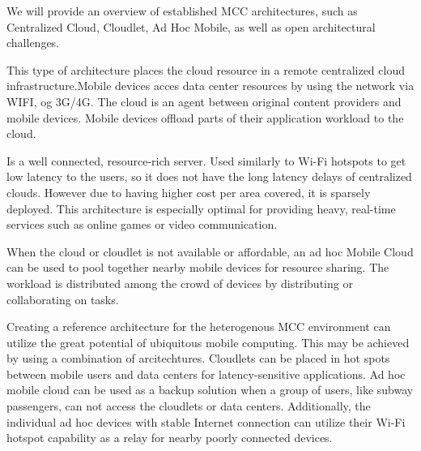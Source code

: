 We will provide an overview of established MCC architectures, such as Centralized Cloud, Cloudlet, Ad Hoc Mobile, as well as open architectural challenges.
\begin{description}[style=nextline]
\item [Centralized Cloud]
This type of architecture places the cloud resource in a remote centralized cloud infrastructure\cite[p.3]{liu2013gearing}.Mobile devices acces data center resources by using the network via WIFI, og 3G/4G. The cloud is an agent between original content providers and mobile devices. Mobile devices offload parts of their application workload to the cloud.
\item [Cloudlet]
Is a well connected, resource-rich server\cite[p.3-4]{liu2013gearing}. Used similarly to Wi-Fi hotspots to get low latency to the users, so it does not have the long latency delays of centralized clouds. However due to having higher cost per area covered, it is sparsely deployed. This architecture is especially optimal for providing heavy, real-time services such as online games or video communication.
\item [ad hoc Mobile Cloud]
When the cloud or cloudlet is not available or affordable, an ad hoc Mobile Cloud can be used to pool together nearby mobile devices for resource sharing\cite[p.4]{liu2013gearing}. The workload is distributed among the crowd of devices by distributing or collaborating on tasks.
\item [Architectural Challenges]
Creating a reference architecture for the heterogenous MCC environment can utilize the great potential of ubiquitous mobile computing\cite{sanaei2014heterogeneity}. This may be achieved by using a combination of arcitechtures. Cloudlets can be placed in hot spots between mobile users and data centers for latency-sensitive applications. Ad hoc mobile cloud can be used as a backup solution when a group of users, like subway passengers, can not access the cloudlets or data centers. Additionally, the individual ad hoc devices with stable Internet connection can utilize their Wi-Fi hotspot capability as a relay for nearby poorly connected devices.




\end{description}